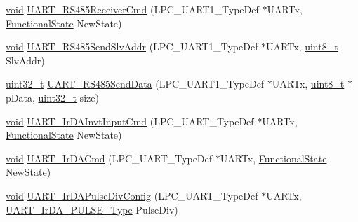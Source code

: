 \begin{DoxyCompactItemize}
\item 
\hyperlink{usb__devapi_8h_afabf60e7f57651d6d595a02c75f07cd0}{void} \hyperlink{group___u_a_r_t___public___functions_ga8c43ccaa9104baab28df1b0afe57a195}{U\+A\+R\+T\+\_\+\+R\+S485\+Receiver\+Cmd} (L\+P\+C\+\_\+\+U\+A\+R\+T1\+\_\+\+Type\+Def $\ast$U\+A\+R\+Tx, \hyperlink{agilefox_2library_2inc_2stm32f10x__type_8h_ac9a7e9a35d2513ec15c3b537aaa4fba1}{Functional\+State} New\+State)
\item 
\hyperlink{usb__devapi_8h_afabf60e7f57651d6d595a02c75f07cd0}{void} \hyperlink{group___u_a_r_t___public___functions_ga51d8e73f086bb57478966b6b699404d8}{U\+A\+R\+T\+\_\+\+R\+S485\+Send\+Slv\+Addr} (L\+P\+C\+\_\+\+U\+A\+R\+T1\+\_\+\+Type\+Def $\ast$U\+A\+R\+Tx, \hyperlink{_p_e___types_8h_aba7bc1797add20fe3efdf37ced1182c5}{uint8\+\_\+t} Slv\+Addr)
\item 
\hyperlink{_p_e___types_8h_a33594304e786b158f3fb30289278f5af}{uint32\+\_\+t} \hyperlink{group___u_a_r_t___public___functions_ga97fc6a99efa2983668cf2d18c5ff7536}{U\+A\+R\+T\+\_\+\+R\+S485\+Send\+Data} (L\+P\+C\+\_\+\+U\+A\+R\+T1\+\_\+\+Type\+Def $\ast$U\+A\+R\+Tx, \hyperlink{_p_e___types_8h_aba7bc1797add20fe3efdf37ced1182c5}{uint8\+\_\+t} $\ast$p\+Data, \hyperlink{_p_e___types_8h_a33594304e786b158f3fb30289278f5af}{uint32\+\_\+t} size)
\item 
\hyperlink{usb__devapi_8h_afabf60e7f57651d6d595a02c75f07cd0}{void} \hyperlink{group___u_a_r_t___public___functions_gaf124bd5ad22ea3060cbb388f76fdb3d7}{U\+A\+R\+T\+\_\+\+Ir\+D\+A\+Invt\+Input\+Cmd} (L\+P\+C\+\_\+\+U\+A\+R\+T\+\_\+\+Type\+Def $\ast$U\+A\+R\+Tx, \hyperlink{agilefox_2library_2inc_2stm32f10x__type_8h_ac9a7e9a35d2513ec15c3b537aaa4fba1}{Functional\+State} New\+State)
\item 
\hyperlink{usb__devapi_8h_afabf60e7f57651d6d595a02c75f07cd0}{void} \hyperlink{group___u_a_r_t___public___functions_ga4c946a4ac4dd32ea5644f78cebaccc85}{U\+A\+R\+T\+\_\+\+Ir\+D\+A\+Cmd} (L\+P\+C\+\_\+\+U\+A\+R\+T\+\_\+\+Type\+Def $\ast$U\+A\+R\+Tx, \hyperlink{agilefox_2library_2inc_2stm32f10x__type_8h_ac9a7e9a35d2513ec15c3b537aaa4fba1}{Functional\+State} New\+State)
\item 
\hyperlink{usb__devapi_8h_afabf60e7f57651d6d595a02c75f07cd0}{void} \hyperlink{group___u_a_r_t___public___functions_ga066c5b2f961d138fd388be4edff883ad}{U\+A\+R\+T\+\_\+\+Ir\+D\+A\+Pulse\+Div\+Config} (L\+P\+C\+\_\+\+U\+A\+R\+T\+\_\+\+Type\+Def $\ast$U\+A\+R\+Tx, \hyperlink{group___u_a_r_t___public___types_ga2e41fe7d668367ce455940f7dfde1d92}{U\+A\+R\+T\+\_\+\+Ir\+D\+A\+\_\+\+P\+U\+L\+S\+E\+\_\+\+Type} Pulse\+Div)
\end{DoxyCompactItemize}


